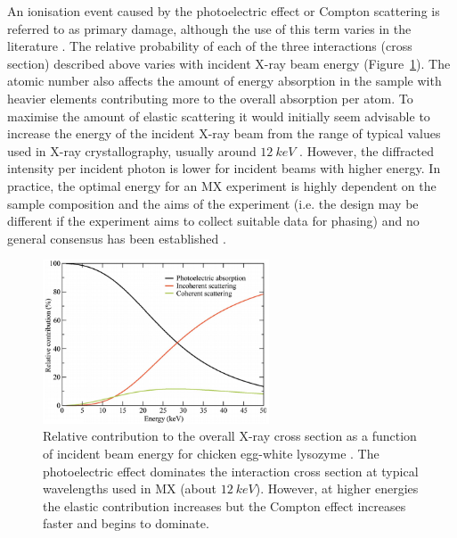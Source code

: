         An ionisation event caused by the photoelectric effect or Compton scattering is referred to as primary damage, although the use of this term varies in the literature \cite{garman2010}.
        The relative probability of each of the three interactions (cross section) described above varies with incident X-ray beam energy (Figure~\ref{fig:Relative Absorption Probabilities}). The atomic number also affects the amount of energy absorption in the sample with heavier elements contributing more to the overall absorption per atom.
        To maximise the amount of elastic scattering it would initially seem advisable to increase the energy of the incident X-ray beam from the range of typical values used in X-ray crystallography, usually around $12\ keV$ \cite{pait2010}.
        However, the diffracted intensity per incident photon is lower for incident beams with higher energy. In practice, the optimal energy for an MX experiment is highly dependent on the sample composition and the aims of the experiment (i.e. the design may be different if the experiment aims to collect suitable data for phasing) and no general consensus has been established \cite{pait2010}.
        \begin{figure}
            \centering
            \includegraphics[width=0.6\textwidth]{figures/introduction/relativeinteractions.png}
            \caption{Relative contribution to the overall X-ray cross section as a function of incident beam energy for chicken egg-white lysozyme \cite{pait2010}. The photoelectric effect dominates the interaction cross section at typical wavelengths used in MX (about $12\ keV$). However, at higher energies the elastic contribution increases but the Compton effect increases faster and begins to dominate.}
            \label{fig:Relative Absorption Probabilities}
        \end{figure}

